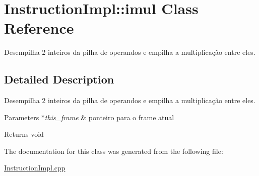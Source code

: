 \hypertarget{class_instruction_impl_1_1imul}{}\section{Instruction\+Impl\+:\+:imul Class Reference}
\label{class_instruction_impl_1_1imul}


Desempilha 2 inteiros da pilha de operandos e empilha a multiplicação entre eles.  




\subsection{Detailed Description}
Desempilha 2 inteiros da pilha de operandos e empilha a multiplicação entre eles. 


\begin{DoxyParams}{Parameters}
{\em $\ast$this\+\_\+frame} & ponteiro para o frame atual \\
\hline
\end{DoxyParams}
\begin{DoxyReturn}{Returns}
void 
\end{DoxyReturn}


The documentation for this class was generated from the following file\+:\begin{DoxyCompactItemize}
\item 
\hyperlink{_instruction_impl_8cpp}{Instruction\+Impl.\+cpp}\end{DoxyCompactItemize}
